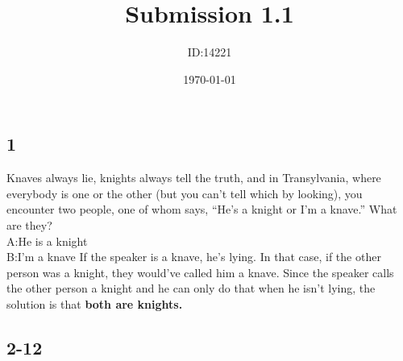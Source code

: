 \documentclass[]{article}
\date{\today}
\author{ID:14221}
\title{Submission 1.1}
\begin{document}
\maketitle

\subsection{1}
Knaves always lie, knights always tell the truth, and in Transylvania, where everybody is one or the other (but you can’t tell which by looking), you encounter two people, one of whom says, “He’s a knight or I’m a knave.” What are they?
\\
A:He is a knight
\\
B:I'm a knave
\newline
If the speaker is a knave,  he's lying. In that case, if the other person was a knight, they would've called him a knave. Since the speaker calls the other person a knight and he can only do that when he isn't lying, the solution is that \textbf{both are knights.} 

\subsection{2-12}
\end{document}
